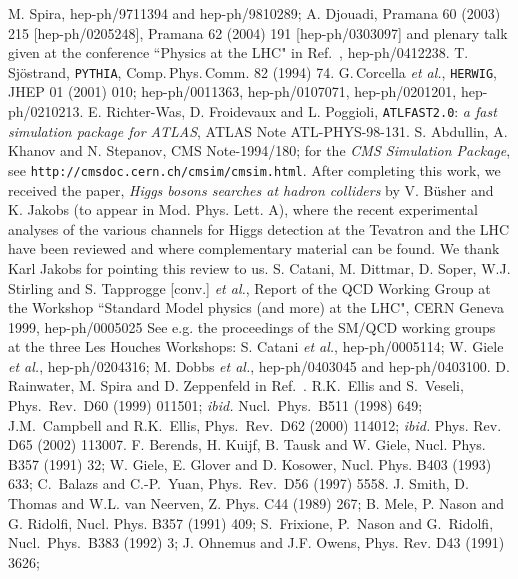 \begin{thebibliography}{999}
M. Spira, hep-ph/9711394 and hep-ph/9810289; A. Djouadi, Pramana 60 (2003) 215 
[hep-ph/0205248], Pramana 62 (2004) 191 [hep-ph/0303097] and plenary talk 
given at the conference ``Physics at the LHC" in Ref.~\cite{Vienna}, 
hep-ph/0412238. 
% 
 T.\,Sj\"ostrand, {\tt PYTHIA}, Comp.\,Phys.\,Comm. 82 (1994) 
74. 
%
 G.\,Corcella {\it et al.}, {\tt HERWIG}, JHEP 01 (2001) 010;  
hep-ph/0011363, hep-ph/0107071, hep-ph/0201201, hep-ph/0210213. 
%
E. Richter-Was, D. Froidevaux and L. Poggioli, {\tt ATLFAST2.0}: {\it a fast
simulation package for ATLAS}, ATLAS Note ATL-PHYS-98-131.  
%
 S. Abdullin, A. Khanov and N. Stepanov, CMS Note-1994/180; 
for the  {\it CMS Simulation Package}, see 
{\tt http://cmsdoc.cern.ch/cmsim/cmsim.html}.
%
 After completing this work, we received the paper, {\it 
Higgs bosons searches at hadron colliders} by V. B\"usher and K. Jakobs (to
appear in Mod. Phys. Lett. A), where the recent experimental analyses of the
various channels for Higgs detection at the Tevatron and the LHC have been
reviewed and where complementary material can be found. We thank Karl Jakobs
for pointing this review to us.  
% 
 S. Catani, M. Dittmar, D. Soper, W.J. Stirling and S. 
Tapprogge [conv.] {\it et al.}, Report of the QCD Working Group at the Workshop
``Standard Model physics (and more) at the LHC", CERN Geneva 1999, 
hep-ph/0005025
% 
See e.g. the proceedings of the SM/QCD working groups at the three Les 
Houches Workshops: S. Catani {\it et al.}, hep-ph/0005114; W. Giele {\it et al.}, 
hep-ph/0204316; M. Dobbs {\it et al.}, hep-ph/0403045 and hep-ph/0403100.
%
 D. Rainwater, M. Spira and D. Zeppenfeld in 
Ref.~\cite{Houches2003}. 
%
 R.K.~Ellis and S.~Veseli, Phys.~Rev.~D60 (1999) 011501;  
{\it ibid.} Nucl.~Phys.~B511 (1998) 649; J.M.~Campbell and R.K.~Ellis, 
Phys.~Rev.~D62 (2000) 114012; {\it ibid.} Phys. Rev. D65 (2002) 113007. 
%
 F. Berends, H. Kuijf, B. Tausk and W. Giele, Nucl. 
Phys. B357 (1991) 32; 
W. Giele, E. Glover and D. Kosower, Nucl. Phys. B403 (1993) 633; 
C.~Balazs and C.-P.~Yuan, Phys.\ Rev.\ D56 (1997) 5558.    
%
 J. Smith, D. Thomas and W.L. van Neerven, Z. Phys. C44 
(1989) 267; B. Mele, P. Nason and G. Ridolfi, Nucl. Phys. B357 (1991) 
409; S.~Frixione, P.~Nason and G.~Ridolfi, Nucl.~Phys.~B383 
(1992) 3; J. Ohnemus and J.F. Owens, Phys. Rev. D43 (1991) 3626; 

\end{thebibliography}
